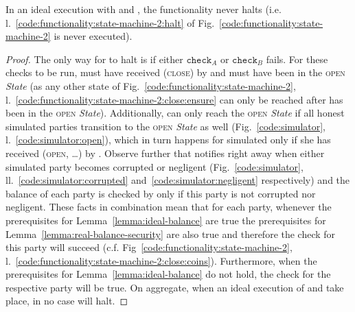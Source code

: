 \begin{lemma}[No halt]
\label{lemma:no-halt}
  In an ideal execution with \fchan and \simulator, the functionality never
  halts (i.e. l.~\ref{code:functionality:state-machine-2:halt} of
  Fig.~\ref{code:functionality:state-machine-2} is never executed).
\end{lemma}

\begin{proof}
  The only way for \fchan to halt is if either $\texttt{check}_A$ or
  $\texttt{check}_B$ fails. For these checks to be run, \fchan must have
  received (\textsc{close}) by \simulator and must have been in the
  \textsc{open} \textit{State} (as any other state of
  Fig.~\ref{code:functionality:state-machine-2},
  l.~\ref{code:functionality:state-machine-2:close:ensure} can only be reached
  after \fchan has been in the \textsc{open} \textit{State}). Additionally,
  \fchan can only reach the \textsc{open} \textit{State} if all honest simulated
  parties transition to the \textsc{open} \textit{State} as well
  (Fig.~\ref{code:simulator}, l.~\ref{code:simulator:open}), which in turn
  happens for simulated \alice only if she has received (\textsc{open}, \dots)
  by \environment. Observe further that \simulator notifies \fchan right away
  when either simulated party becomes corrupted or negligent
  (Fig.~\ref{code:simulator}, ll.~\ref{code:simulator:corrupted}
  and~\ref{code:simulator:negligent} respectively) and the balance of each party
  is checked by \fchan only if this party is not corrupted nor negligent. These
  facts in combination mean that for each party, whenever the prerequisites for
  Lemma~\ref{lemma:ideal-balance} are true the prerequisites for
  Lemma~\ref{lemma:real-balance-security} are also true and therefore the check
  for this party will succeed (c.f.
  Fig~\ref{code:functionality:state-machine-2},
  l.~\ref{code:functionality:state-machine-2:close:coins}). Furthermore, when
  the prerequisites for Lemma~\ref{lemma:ideal-balance} do not hold, the check
  for the respective party will be true. On aggregate, when an ideal execution
  of \fchan and \simulator take place, in no case will \fchan halt.
\end{proof}
